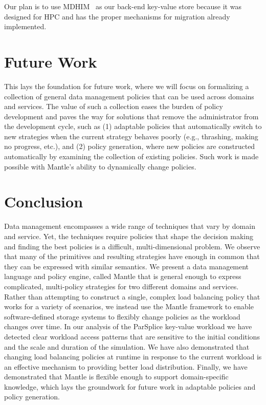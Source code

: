 Our plan is to use MDHIM~\cite{greenberg:hotstorage2015-mdhim} as our back-end
key-value store because it was designed for HPC and has the proper mechanisms
for migration already implemented.  

\section{Future Work}

This lays the foundation for future work, where we will focus on formalizing a
collection of general data management policies that can be used across domains
and services. The value of such a collection eases the burden of policy
development and paves the way for solutions that remove the administrator from
the development cycle, such as (1) adaptable policies that automatically switch
to new strategies when the current strategy behaves poorly ({e.g.}, thrashing,
making no progress, etc.), and (2) policy generation, where new policies are
constructed automatically by examining the collection of existing policies.
Such work is made possible with Mantle's ability to dynamically change
policies.

\section{Conclusion}

Data management encompasses a wide range of techniques that vary by domain and
service. Yet, the techniques require policies that shape the decision making
and finding the best policies is a difficult, multi-dimensional problem. We
observe that many of the primitives and resulting strategies have enough in
common that they can be expressed with similar semantics. We present a data
management language and policy engine, called Mantle that is general enough to
express complicated, multi-policy strategies for two different domains and services.
Rather than attempting to construct a single, complex load balancing policy
that works for a variety of scenarios, we instead use the Mantle framework to
enable software-defined storage systems to flexibly change policies as the
workload changes over time.  In our analysis of the ParSplice key-value
workload we have detected clear workload access patterns that are sensitive to the
initial conditions and the scale and duration of the simulation. We have also
demonstrated that changing load balancing policies at runtime in response to
the current workload is an effective mechanism to providing better load
distribution.  Finally, we have demonstrated that Mantle is flexible enough to
support domain-specific knowledge, which lays the groundwork for future work in
adaptable policies and policy generation.

